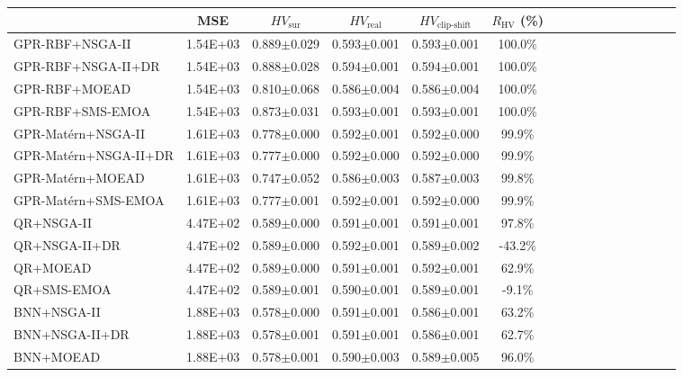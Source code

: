 \begin{table}[htbp]
{\begin{tabular}{l c c c c c c c c c c c c c c c}
\cmidrule(lr){2-6}
 & MSE & $HV_{\mathrm{sur}}$ & $HV_{\mathrm{real}}$ & $HV_{\mathrm{clip\text{-}shift}}$ & $R_{\mathrm{HV}}$ (\%) &  &  &  &  &  &  &  &  &  &  \\
\hline
GPR-RBF+NSGA-II & 1.54E+03 & 0.889$\pm$0.029 & 0.593$\pm$0.001 & 0.593$\pm$0.001 & 100.0\% &  &  &  &  &  &  &  &  &  &  \\
GPR-RBF+NSGA-II+DR & 1.54E+03 & 0.888$\pm$0.028 & 0.594$\pm$0.001 & 0.594$\pm$0.001 & 100.0\% &  &  &  &  &  &  &  &  &  &  \\
GPR-RBF+MOEAD & 1.54E+03 & 0.810$\pm$0.068 & 0.586$\pm$0.004 & 0.586$\pm$0.004 & 100.0\% &  &  &  &  &  &  &  &  &  &  \\
GPR-RBF+SMS-EMOA & 1.54E+03 & 0.873$\pm$0.031 & 0.593$\pm$0.001 & 0.593$\pm$0.001 & 100.0\% &  &  &  &  &  &  &  &  &  &  \\
GPR-Mat\'ern+NSGA-II & 1.61E+03 & 0.778$\pm$0.000 & 0.592$\pm$0.001 & 0.592$\pm$0.000 & 99.9\% &  &  &  &  &  &  &  &  &  &  \\
GPR-Mat\'ern+NSGA-II+DR & 1.61E+03 & 0.777$\pm$0.000 & 0.592$\pm$0.000 & 0.592$\pm$0.000 & 99.9\% &  &  &  &  &  &  &  &  &  &  \\
GPR-Mat\'ern+MOEAD & 1.61E+03 & 0.747$\pm$0.052 & 0.586$\pm$0.003 & 0.587$\pm$0.003 & 99.8\% &  &  &  &  &  &  &  &  &  &  \\
GPR-Mat\'ern+SMS-EMOA & 1.61E+03 & 0.777$\pm$0.001 & 0.592$\pm$0.001 & 0.592$\pm$0.000 & 99.9\% &  &  &  &  &  &  &  &  &  &  \\
QR+NSGA-II & 4.47E+02 & 0.589$\pm$0.000 & 0.591$\pm$0.001 & 0.591$\pm$0.001 & 97.8\% &  &  &  &  &  &  &  &  &  &  \\
QR+NSGA-II+DR & 4.47E+02 & 0.589$\pm$0.000 & 0.592$\pm$0.001 & 0.589$\pm$0.002 & -43.2\% &  &  &  &  &  &  &  &  &  &  \\
QR+MOEAD & 4.47E+02 & 0.589$\pm$0.000 & 0.591$\pm$0.001 & 0.592$\pm$0.001 & 62.9\% &  &  &  &  &  &  &  &  &  &  \\
QR+SMS-EMOA & 4.47E+02 & 0.589$\pm$0.001 & 0.590$\pm$0.001 & 0.589$\pm$0.001 & -9.1\% &  &  &  &  &  &  &  &  &  &  \\
BNN+NSGA-II & 1.88E+03 & 0.578$\pm$0.000 & 0.591$\pm$0.001 & 0.586$\pm$0.001 & 63.2\% &  &  &  &  &  &  &  &  &  &  \\
BNN+NSGA-II+DR & 1.88E+03 & 0.578$\pm$0.001 & 0.591$\pm$0.001 & 0.586$\pm$0.001 & 62.7\% &  &  &  &  &  &  &  &  &  &  \\
BNN+MOEAD & 1.88E+03 & 0.578$\pm$0.001 & 0.590$\pm$0.003 & 0.589$\pm$0.005 & 96.0\% &  &  &  &  &  &  &  &  &  &  \\

\end{tabular}}
\end{table}
